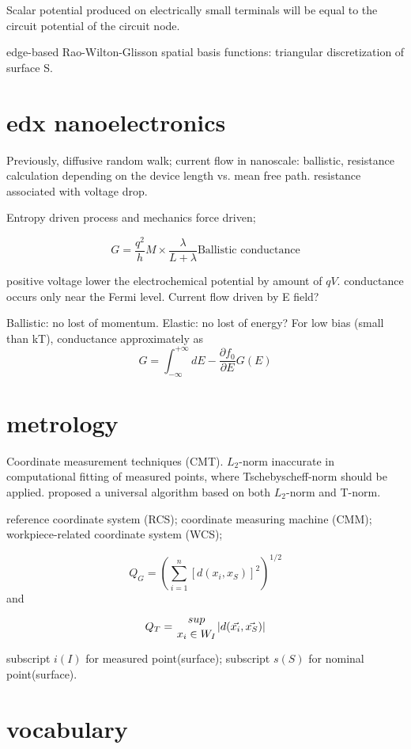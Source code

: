 Scalar potential produced on electrically small terminals will be equal to the circuit potential of the circuit node. 

edge-based Rao-Wilton-Glisson spatial basis functions: triangular discretization of surface S.



\section{edx nanoelectronics}

Previously, diffusive random walk; current flow in nanoscale: ballistic, resistance calculation depending on the device length vs. mean free path. resistance associated with voltage drop. 

Entropy driven process and mechanics force driven; 

\[
G = \frac{q^2}{h}M\times\frac{\lambda}{L+ \lambda} \text{Ballistic conductance}
\]

positive voltage lower the electrochemical potential by amount of $qV$. conductance occurs only near the Fermi level. Current flow driven by E field? 

Ballistic: no lost of momentum. Elastic: no lost of energy?  
For low bias (small than kT), conductance approximately as
\[
G = \int_{-\infty}^{+\infty} dE -\frac{\partial f_0}{\partial E}G(E)
\]

\section{metrology}

Coordinate measurement techniques (CMT).\cite{Goch1990} $L_2$-norm inaccurate in computational fitting of measured points, where Tschebyscheff-norm should be applied. \citeauthor{Goch1990} proposed a universal algorithm based on both $L_2$-norm and T-norm. 

reference coordinate system (RCS); coordinate measuring machine (CMM); workpiece-related coordinate system (WCS); 

\[
Q_G = (\sum_{i=1}^n [d(x_i, x_S)]^2)^{1/2}
\]
and

\[
Q_T = {sup \atop x_i\in W_I} |d(\vec{x_i}, \vec{x_S})|
\]

subscript $i(I)$ for measured point(surface); subscript $s(S)$ for nominal point(surface). 



\section{vocabulary}

